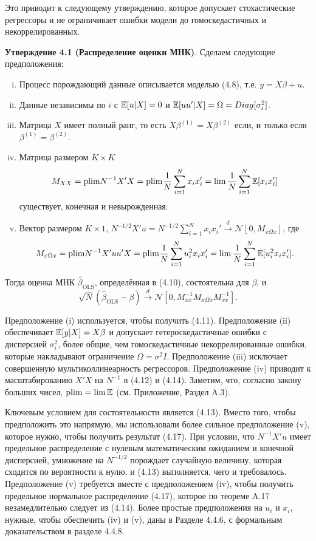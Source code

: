 Это приводит к следующему утверждению, которое допускает стохастические регрессоры и не ограничивает ошибки модели до гомоскедастичных и некоррелированных.

\textbf{Утверждение 4.1 (Распределение оценки МНК)}. Сделаем следующие предположения:
\begin{enumerate}[(i)]
 \item Процесс порождающий данные описывается моделью (4.8), т.е. $y = X \beta +u$.
 \item Данные независимы по $i$ с $\mathbb{E}{[u|X]}=0$ и $\mathbb{E}{[uu'|X]}=\Omega = Diag[\sigma_i^2]$.
 \item Матрица $X$ имеет полный ранг, то есть $X\beta^{(1)}=X\beta^{(2)}$ если, и только если $\beta^{(1)} = \beta^{(2)}$.
 \item Матрица размером $K \times K $
 \begin{equation}
 	M_{XX}= \mathrm{plim } N^{-1}X'X = \mathrm{plim } \frac{1}{N}\sum_{i=1}^N x_ix_i' = \lim \frac{1}{N} \sum_{i=1}^N \mathbb{E}{[x_i x_i']}
 \end{equation}
 существует, конечная и невырожденная.
 \item Вектор размером $K \times 1 $, $N^{-1/2}X'u=N^{-1/2}\sum_{i=1}^N x_ix_i' \xrightarrow{d} \mathcal{N}[0,M_{x \Omega x}] $, где
 \begin{equation}
 M_{x \Omega x} = \mathrm{plim } N^{-1} X'uu'X = \mathrm{plim } \frac{1}{N} \sum_{i=1}^N u_i^2 x_i x_i' = \lim \frac{1}{N} \sum_{i=1}^N \mathbb{E} [u_i^2 x_i x_i'].
 \end{equation}
\end{enumerate} 

Тогда оценка МНК $\hat{\beta}_{\text{OLS}}$, определённая в (4.10), состоятельна для $\beta$, и 
\begin{equation}
\sqrt{N}(\hat{\beta}_{\text{OLS}}-\beta) \xrightarrow{d} \mathcal{N} [0, M_{xx}^{-1}M_{x \Omega x} M_{xx}^{-1}].
\end{equation}


Предположение (i) используется, чтобы получить (4.11). Предположение (ii) обеспечивает $\mathbb{E} [y|X] = X\beta$  и допускает гетероскедастичные ошибки с дисперсией $\sigma_i^2$, более общие, чем гомоскедастичные некоррелированные ошибки, которые накладывают ограничение  $\Omega = \sigma^2 I$. Предположение (iii) исключает совершенную мультиколлинеарность регрессоров. Предположение (iv) приводит к масштабированию $X'X$ на $N^{-1}$  в (4.12) и (4.14). Заметим, что, согласно закону больших чисел, $\mathrm{plim } = \lim \mathbb{E}$ (см. Приложение, Раздел A.3).

Ключевым условием для состоятельности является (4.13). Вместо того, чтобы предположить это напрямую, мы использовали более сильное предположение (v), которое нужно, чтобы получить результат (4.17). При условии, что $N^{-1}X'u$ имеет предельное распределение с нулевым математическим ожиданием и конечной дисперсией, умножение на $N^{-1/2}$ порождает случайную величину, которая сходится по вероятности к нулю, и (4.13) выполняется, чего и требовалось. Предположение (v) требуется вместе с предположением (iv), чтобы получить предельное нормальное распределение (4.17), которое по теореме A.17 незамедлительно следует из (4.14). Более простые предположения на $u_i$ и $x_i$, нужные, чтобы обеспечить (iv) и (v), даны в Разделе 4.4.6, с формальным доказательством в разделе 4.4.8.

